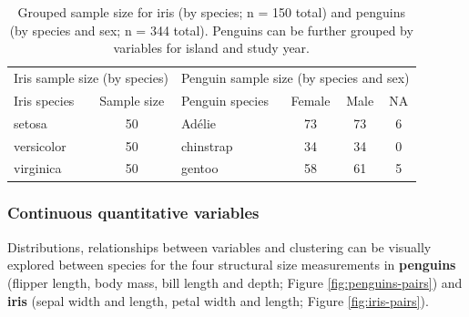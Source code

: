 \begin{Schunk}
\begin{table}

\caption{\label{tab:unnamed-chunk-2}Grouped sample size for iris (by species; n = 150 total) and penguins (by species and sex; n = 344 total). Penguins can be further grouped by variables for island and study year.}
\centering
\begin{tabular}[t]{l|c|l|c|c|c}
\hline
\multicolumn{2}{c|}{Iris sample size (by species)} & \multicolumn{4}{c}{Penguin sample size (by species and sex)} \\
\cline{1-2} \cline{3-6}
Iris species & Sample size & Penguin species & Female & Male & NA\\
\hline
setosa & 50 & Adélie & 73 & 73 & 6\\
\hline
versicolor & 50 & chinstrap & 34 & 34 & 0\\
\hline
virginica & 50 & gentoo & 58 & 61 & 5\\
\hline
\end{tabular}
\end{table}

\end{Schunk}

\hypertarget{continuous-quantitative-variables}{%
\subsubsection{Continuous quantitative
variables}\label{continuous-quantitative-variables}}

Distributions, relationships between variables and clustering can be
visually explored between species for the four structural size
measurements in \textbf{penguins} (flipper length, body mass, bill
length and depth; Figure \ref{fig:penguins-pairs}) and \textbf{iris}
(sepal width and length, petal width and length; Figure
\ref{fig:iris-pairs}).

